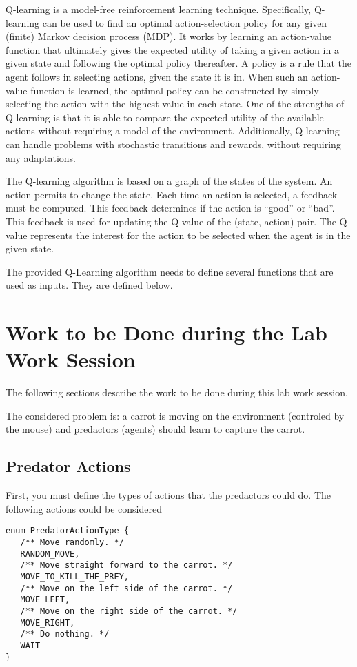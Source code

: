 \documentclass[article,english,nodocumentinfo]{multiagentfrreport}
\begin{document}
Q-learning is a model-free reinforcement learning technique.
Specifically, Q-learning can be used to find an optimal action-selection policy for any given (finite) Markov decision process (MDP).
It works by learning an action-value function that ultimately gives the expected utility of taking a given action in a given state and following the optimal policy thereafter.
A policy is a rule that the agent follows in selecting actions, given the state it is in.
When such an action-value function is learned, the optimal policy can be constructed by simply selecting the action with the highest value in each state.
One of the strengths of Q-learning is that it is able to compare the expected utility of the available actions without requiring a model of the environment.
Additionally, Q-learning can handle problems with stochastic transitions and rewards, without requiring any adaptations.

The Q-learning algorithm is based on a graph of the states of the system.
An action permits to change the state.
Each time an action is selected, a feedback must be computed. This feedback determines if the action is ``good'' or ``bad''. This feedback is used for updating the Q-value of the (state, action) pair. The Q-value represents the interest for the action to be selected when the agent is in the given state. 

The provided Q-Learning algorithm needs to define several functions that are used as inputs.
They are defined below.

\section{Work to be Done during the Lab Work Session}

The following sections describe the work to be done during this lab work session.

The considered problem is: a carrot is moving on the environment (controled by the mouse) and predactors (agents) should learn to capture the carrot.

\subsection{Predator Actions}

First, you must define the types of actions that the predactors could do.
The following actions could be considered
\begin{lstlisting}
enum PredatorActionType {
   /** Move randomly. */
   RANDOM_MOVE,
   /** Move straight forward to the carrot. */
   MOVE_TO_KILL_THE_PREY,
   /** Move on the left side of the carrot. */
   MOVE_LEFT,
   /** Move on the right side of the carrot. */
   MOVE_RIGHT,
   /** Do nothing. */
   WAIT
}
\end{lstlisting}
\end{document}
